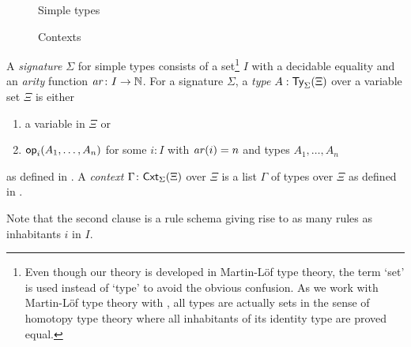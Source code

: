 \begin{definition} \label{def:simple-signature}
  \begin{figure}
    \begin{minipage}[b]{.6\textwidth}
      \centering
      \small
      \caption{Simple types}
      \label{fig:simple-type}
    \end{minipage}
    \begin{minipage}[b]{.35\textwidth}
      \centering
      \small
      \judgbox{\Xi |-_{\Sigma} \Gamma}{}
      \caption{Contexts}
    \label{fig:simple-context}
    \end{minipage}
  \end{figure}

  A \emph{signature} $\Sigma$ for simple types consists of a set\footnote{%
    Even though our theory is developed in Martin-L\"of type theory, the term `set' is used instead of `type' to avoid the obvious confusion. 
    As we work with Martin-L\"of type theory with \AxiomK, all types are actually sets in the sense of homotopy type theory where all inhabitants of its identity type are proved equal.
  }
  $I$ with a decidable equality and an \emph{arity} function $\mathit{ar}\colon I \to \mathbb{N}$.
  For a signature $\Sigma$, a \emph{type} $A : \mathsf{Ty}_{\Sigma}(\Xi)$ over a variable set $\Xi$ is either
  \begin{enumerate}
    \item a variable in $\Xi$ or
    \item $\mathsf{op}_{i}(A_1, \ldots, A_n)$ for some $i:I$ with $\mathit{ar}(i) = n$ and types $A_1,\ldots, A_n$
  \end{enumerate}
  as defined in .
  A \emph{context} $\Gamma \colon \mathsf{Cxt}_{\Sigma}(\Xi)$ over $\Xi$ is a list $\Gamma$ of types over $\Xi$ as defined in . 
\end{definition}
Note that the second clause is a rule schema giving rise to as many rules as inhabitants $i$ in $I$.

